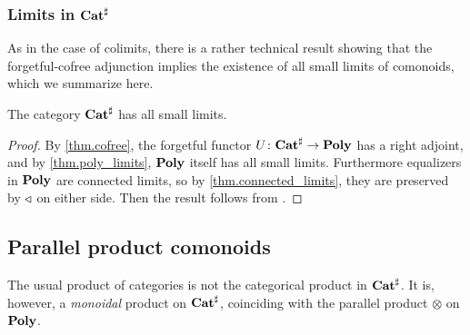 \documentclass[Book-Poly]{subfiles}
\begin{document}
\subsubsection{Limits in $\mathbf{Cat}^\sharp$}

As in the case of colimits, there is a rather technical result showing that the forgetful-cofree adjunction implies the existence of all small limits of comonoids, which we summarize here.

\begin{corollary}
The category $\mathbf{Cat}^\sharp$ has all small limits.
\end{corollary}
\begin{proof}
By \cref{thm.cofree}, the forgetful functor $U\colon\mathbf{Cat}^\sharp\to\mathbf{Poly}$ has a right adjoint, and by \cref{thm.poly_limits}, $\mathbf{Poly}$ itself has all small limits.
Furthermore equalizers in $\mathbf{Poly}$ are connected limits, so by \cref{thm.connected_limits}, they are preserved by $\mathbin{\triangleleft}$ on either side.
Then the result follows from \cite[Fact~3.4]{porst2019colimits}.
\end{proof}


\subsection{Parallel product comonoids}

The usual product of categories is not the categorical product in $\mathbf{Cat}^\sharp$. %
It is, however, a \emph{monoidal} product on $\mathbf{Cat}^\sharp$, coinciding with the parallel product $\otimes$ on $\mathbf{Poly}$.
\end{document}
